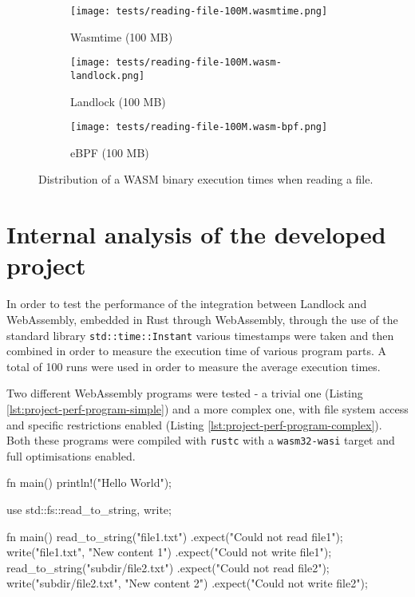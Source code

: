 \begin{figure}[ht!]
  \begin{subfigure}[b]{0.32\textwidth}
    \centering
    \texttt{[image: tests/reading-file-100M.wasmtime.png]}
    \caption{Wasmtime (100 MB)}
  \end{subfigure}
  \begin{subfigure}[b]{0.32\textwidth}
    \centering
    \texttt{[image: tests/reading-file-100M.wasm-landlock.png]}
    \caption{Landlock (100 MB)}
  \end{subfigure}
  \begin{subfigure}[b]{0.32\textwidth}
    \centering
    \texttt{[image: tests/reading-file-100M.wasm-bpf.png]}
    \caption{eBPF (100 MB)}
  \end{subfigure}

  \caption{Distribution of a WASM binary execution times when reading a file.}
  \label{fig:distribution-reading-wasm}
\end{figure}

\clearpage
\section{Internal analysis of the developed project}
\label{sec:performance-internal-analysis}

In order to test the performance of the integration between Landlock and WebAssembly,
embedded in Rust through WebAssembly, through the use of the standard library \texttt{std::time::Instant}
various timestamps were taken and then combined in order to measure the execution time of various program parts.
A total of 100 runs were used in order to measure the average execution times.

Two different WebAssembly programs were tested - a trivial one
(Listing \ref{lst:project-perf-program-simple}) and a more complex one, with
file system access and specific restrictions enabled (Listing \ref{lst:project-perf-program-complex}).
Both these programs were compiled with \texttt{rustc} with a \texttt{wasm32-wasi} target and full
optimisations enabled.

\vspace*{0.5cm}

\begin{code}[language=Rust, caption=The tested trivial program, label=lst:project-perf-program-simple]
  fn main() {
    println!("Hello World");
  }
\end{code}

\begin{code}[language=Rust, caption=The more complex tested program, label=lst:project-perf-program-complex]
use std::fs::{read_to_string, write};

fn main() {
  read_to_string("file1.txt")
    .expect("Could not read file1");
  write("file1.txt", "New content 1")
    .expect("Could not write file1");
  read_to_string("subdir/file2.txt")
    .expect("Could not read file2");
  write("subdir/file2.txt", "New content 2")
    .expect("Could not write file2");
}  
\end{code}

